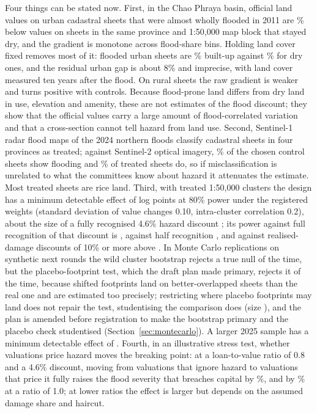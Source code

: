 Four things can be stated now. First, in the Chao Phraya basin, official land values on urban cadastral sheets that were almost wholly flooded in 2011 are \binTopUrbanPct\% below values on sheets in the same province and 1:50,000 map block that stayed dry, and the gradient is monotone across flood-share bins. Holding land cover fixed removes most of it: flooded urban sheets are \lcUrbanBuiltTop\% built-up against \lcUrbanBuiltRef\% for dry ones, and the residual urban gap is about 8\% and imprecise, with land cover measured ten years after the flood. On rural sheets the raw gradient is weaker and turns positive with controls. Because flood-prone land differs from dry land in use, elevation and amenity, these are not estimates of the flood discount; they show that the official values carry a large amount of flood-correlated variation and that a cross-section cannot tell hazard from land use. Second, Sentinel-1 radar flood maps of the 2024 northern floods classify \radarTreated{} cadastral sheets in four provinces as treated; against Sentinel-2 optical imagery, \valControlContam\% of the chosen control sheets show flooding and \valTreatedPrec\% of treated sheets do, so if misclassification is unrelated to what the committees know about hazard it attenuates the estimate. Most treated sheets are rice land. Third, with \radarTreatedClusters{} treated 1:50,000 clusters the design has a minimum detectable effect of \regMdePooled{} log points at 80\% power under the registered weights (standard deviation of value changes 0.10, intra-cluster correlation 0.2), about the size of a fully recognised 4.6\% hazard discount \citep{beltran2018flood}; its power against full recognition of that discount is \powFullMid, against half recognition \powHalfMid, and against realised-damage discounts of 10\% or more above \powDamageTen. In \mcxReps{} Monte Carlo replications on synthetic next rounds the wild cluster bootstrap rejects a true null \mcxNullWcb{} of the time, but the placebo-footprint test, which the draft plan made primary, rejects it \mcxNullRi{} of the time, because shifted footprints land on better-overlapped sheets than the real one and are estimated too precisely; restricting where placebo footprints may land does not repair the test, studentising the comparison does (size \prxNullRegT), and the plan is amended before registration to make the bootstrap primary and the placebo check studentised (Section~\ref{sec:montecarlo}). A larger 2025 sample has a minimum detectable effect of \evMdeW. Fourth, in an illustrative stress test, whether valuations price hazard moves the breaking point: at a loan-to-value ratio of 0.8 and a 4.6\% discount, moving from valuations that ignore hazard to valuations that price it fully raises the flood severity that breaches capital by \lamSStarEightChange\%, and by \lamSStarOneChange\% at a ratio of 1.0; at lower ratios the effect is larger but depends on the assumed damage share and haircut.

